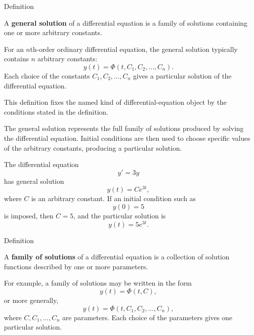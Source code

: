 
\begin{definitionbox}{Definition}
\begin{definition}
\label{def:ordinary-differential-equations-solutions-general-solution}
A \textbf{general solution} of a differential equation is a family of solutions containing one or more arbitrary constants.

For an $n$th-order ordinary differential equation, the general solution typically contains $n$ arbitrary constants:
\[
y(t)=\Phi(t,C_1,C_2,\dots,C_n).
\]
Each choice of the constants $C_1,C_2,\dots,C_n$ gives a particular solution of the differential equation.
\end{definition}
\end{definitionbox}

\begin{remark*}
This definition fixes the named kind of differential-equation object by the
conditions stated in the definition.
\end{remark*}

\NoLocalDependencies

\begin{remark*}[Interpretation]
The general solution represents the full family of solutions produced by solving the differential equation. Initial conditions are then used to choose specific values of the arbitrary constants, producing a particular solution.
\end{remark*}

\begin{example*}
The differential equation
\[
y'=3y
\]
has general solution
\[
y(t)=Ce^{3t},
\]
where $C$ is an arbitrary constant. If an initial condition such as
\[
y(0)=5
\]
is imposed, then $C=5$, and the particular solution is
\[
y(t)=5e^{3t}.
\]
\end{example*}




\begin{definitionbox}{Definition}
\begin{definition}
\label{def:ordinary-differential-equations-solutions-family-of-solutions}
A \textbf{family of solutions} of a differential equation is a collection of solution functions described by one or more parameters.

For example, a family of solutions may be written in the form
\[
y(t)=\Phi(t,C),
\]
or more generally,
\[
y(t)=\Phi(t,C_1,C_2,\dots,C_n),
\]
where $C,C_1,\dots,C_n$ are parameters. Each choice of the parameters gives one particular solution.
\end{definition}
\end{definitionbox}

